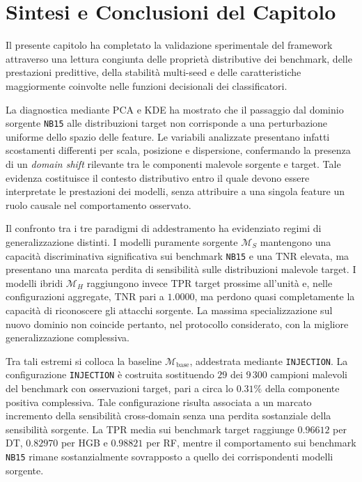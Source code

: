 
\section{Sintesi e Conclusioni del Capitolo}
\label{sec:cap5_conclusioni}

Il presente capitolo ha completato la validazione sperimentale del framework attraverso una lettura congiunta delle proprietà distributive dei benchmark, delle prestazioni predittive, della stabilità multi-seed e delle caratteristiche maggiormente coinvolte nelle funzioni decisionali dei classificatori.

La diagnostica mediante PCA e KDE ha mostrato che il passaggio dal dominio sorgente \texttt{NB15} alle distribuzioni target non corrisponde a una perturbazione uniforme dello spazio delle feature. 
Le variabili analizzate presentano infatti scostamenti differenti per scala, posizione e dispersione, confermando la presenza di un \textit{domain shift} rilevante tra le componenti malevole sorgente e target. 
Tale evidenza costituisce il contesto distributivo entro il quale devono essere interpretate le prestazioni dei modelli, senza attribuire a una singola feature un ruolo causale nel comportamento osservato.

Il confronto tra i tre paradigmi di addestramento ha evidenziato regimi di generalizzazione distinti. 
I modelli puramente sorgente $\mathcal{M}_{S}$ mantengono una capacità discriminativa significativa sui benchmark \texttt{NB15} e una TNR elevata, ma presentano una marcata perdita di sensibilità sulle distribuzioni malevole target. 
I modelli ibridi $\mathcal{M}_{H}$ raggiungono invece TPR target prossime all'unità e, nelle configurazioni aggregate, TNR pari a $1.0000$, ma perdono quasi completamente la capacità di riconoscere gli attacchi sorgente. 
La massima specializzazione sul nuovo dominio non coincide pertanto, nel protocollo considerato, con la migliore generalizzazione complessiva.

Tra tali estremi si colloca la baseline $\mathcal{M}_{\mathrm{base}}$, addestrata mediante \texttt{INJECTION}. 
La configurazione \texttt{INJECTION} è costruita sostituendo $29$ dei $9\,300$ campioni malevoli del benchmark con osservazioni target, pari a circa lo $0.31\%$ della componente positiva complessiva. 
Tale configurazione risulta associata a un marcato incremento della sensibilità cross-domain senza una perdita sostanziale della sensibilità sorgente.
La TPR media sui benchmark target raggiunge $0.96612$ per DT, $0.82970$ per HGB e $0.98821$ per RF, mentre il comportamento sui benchmark \texttt{NB15} rimane sostanzialmente sovrapposto a quello dei corrispondenti modelli sorgente.

